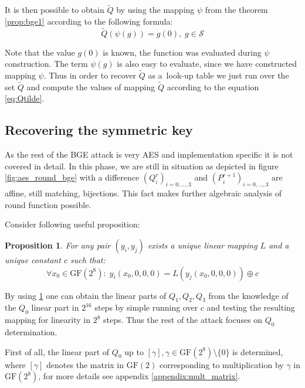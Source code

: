 \documentclass[11pt,oneside,final]{fithesis2}
\newtheorem{myprop}{Proposition}
\newcommand{\gfe}{\ensuremath{\text{GF}\left(2^8\right)}}
\newcommand{\gf}{\ensuremath{\text{GF}\left(2\right)}}
\begin{document}
    It is then possible to obtain $\widetilde{Q}$ by using the mapping $\psi$ from the theorem \ref{prop:bge1} according to the following formula:
    \begin{equation}\label{eq:Qtilde}
     \widetilde{Q}\left(\psi\left(g\right)\right) = g\left(0\right),\; g \in \mathcal{S}
    \end{equation}
    
    Note that the value $g\left(0\right)$ is known, the function was evaluated during $\psi$ construction. The term $\psi\left(g\right)$ is also easy to
    evaluate, since we have constructed mapping $\psi$. Thus in order to recover $\widetilde{Q}$ as a~look-up table we just run over the set $\widetilde{Q}$
    and compute the values of mapping $\widetilde{Q}$ according to the equation \ref{eq:Qtilde}.
    
    \subsection{Recovering the symmetric key}
    As the rest of the BGE attack is very AES and implementation specific it is not covered in detail. In this phase, we are still in situation as
    depicted in figure \ref{fig:aes_round_bge} with a difference $\left(Q^r_i\right)_{i=0,\dots,3}$ and $\left(P^{r+1}_i\right)_{i=0,\dots,3}$
    are affine, still matching, bijections. This fact makes further algebraic analysis of round function possible.
    
    Consider following useful proposition:
    \begin{myprop}\label{prop:bge_prop1}
     For any pair $\left(y_i, y_j\right)$ exists a unique linear mapping $L$ and a unique constant $c$ such that:
     \begin{equation}
	\forall x_0 \in \gfe:\; y_i\left(x_0, 0, 0, 0\right) = L \left(y_j \left(x_0, 0, 0, 0 \right) \right) \oplus c
     \end{equation}
    \end{myprop}
    
    By using \ref{prop:bge_prop1} one can obtain the linear parts of $Q_1, Q_2, Q_3$ from the knowledge of the $Q_0$ linear part in $2^{16}$ steps by simple
    running over $c$ and testing the resulting mapping for linearity in $2^8$ steps. Thus the rest of the attack focuses on $Q_0$ determination.
    
    First of all, the linear part of $Q_0$ up to $\left[\gamma\right], \gamma \in \gfe \setminus \{0\}$ is determined, where $\left[\gamma\right]$ denotes the
    matrix in $\gf$ corresponding to multiplication by $\gamma$ in $\gfe$, for more details see appendix \ref{appendix:mult_matrix}.
    
\end{document}
